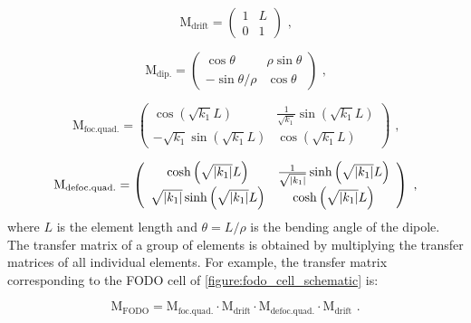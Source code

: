 \begin{equation}
    \mathrm{M_{drift}} = \left(
        \begin{array}{ll}
            1 & L \\
            0 & 1
    \end{array} \right) \text{ ,}
    \label{equation:drift_transfer_matrix}
\end{equation}

\begin{equation}
    \mathrm{M_{dip.}} = \left(
        \begin{array}{cc}
            \cos \theta           & \rho \sin \theta \\
            - \sin \theta / \rho  & \cos \theta
    \end{array} \right) \text{ ,}
    \label{equation:dipole_transfer_matrix}
\end{equation}

\begin{equation}
    \mathrm{M_{foc. quad.}} = \left(
        \begin{array}{cc}
            \cos \left( \sqrt{k_1} L \right)             & \frac{1}{\sqrt{k_1}} \sin \left( \sqrt{k_1} L \right) \\
            -\sqrt{k_1} \sin \left( \sqrt{k_1} L \right) & \cos \left( \sqrt{k_1} L \right)
    \end{array} \right) \text{ ,}
    \label{equation:focusing_quad_transfer_matrix}
\end{equation}

\begin{equation}
    \mathrm{M_{defoc. quad.}} = \left(
        \begin{array}{cc}
            \cosh \left( \sqrt{\left\lvert k_1 \right\rvert} L \right)                 & \frac{1}{\sqrt{\left\lvert k_1 \right\rvert}} \sinh \left( \sqrt{\left\lvert k_1 \right\rvert} L \right) \\
            \sqrt{\left\lvert k_1 \right\rvert} \sinh \left( \sqrt{\left\lvert k_1 \right\rvert} L \right) & \cosh \left( \sqrt{\left\lvert k_1 \right\rvert} L \right)
    \end{array} \right) \text{ ,}
    \label{equation:defocusing_quad_transfer_matrix}
\end{equation}
where \(L\) is the element length and \(\theta = L / \rho\) is the bending angle of the dipole.
The transfer matrix of a group of elements is obtained by multiplying the transfer matrices of all individual elements.
For example, the transfer matrix corresponding to the FODO cell of \cref{figure:fodo_cell_schematic} is:

\begin{equation}
    \mathrm{M_{FODO}} = \mathrm{M_{foc. quad.}} \cdot \mathrm{M_{drift}} \cdot \mathrm{M_{defoc. quad.}} \cdot \mathrm{M_{drift}} \text{ .}
    \label{equation:fodo_transfer_matrix}
\end{equation}

